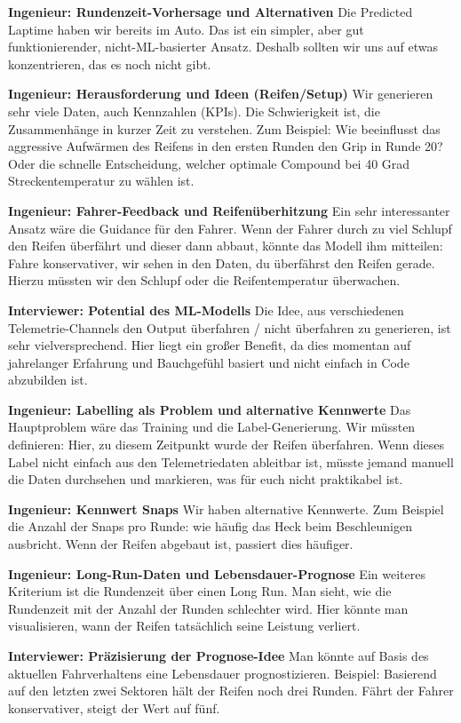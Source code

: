 \textbf{Ingenieur: Rundenzeit-Vorhersage und Alternativen}
Die Predicted Laptime haben wir bereits im Auto. Das ist ein simpler, aber gut funktionierender, nicht-ML-basierter Ansatz. Deshalb sollten wir uns auf etwas konzentrieren, das es noch nicht gibt.

\textbf{Ingenieur: Herausforderung und Ideen (Reifen/Setup)}
Wir generieren sehr viele Daten, auch Kennzahlen (KPIs). Die Schwierigkeit ist, die Zusammenhänge in kurzer Zeit zu verstehen. Zum Beispiel: Wie beeinflusst das aggressive Aufwärmen des Reifens in den ersten Runden den Grip in Runde 20? Oder die schnelle Entscheidung, welcher optimale Compound bei 40 Grad Streckentemperatur zu wählen ist.

\textbf{Ingenieur: Fahrer-Feedback und Reifenüberhitzung}
Ein sehr interessanter Ansatz wäre die Guidance für den Fahrer. Wenn der Fahrer durch zu viel Schlupf den Reifen überfährt und dieser dann abbaut, könnte das Modell ihm mitteilen: Fahre konservativer, wir sehen in den Daten, du überfährst den Reifen gerade. Hierzu müssten wir den Schlupf oder die Reifentemperatur überwachen.

\textbf{Interviewer: Potential des ML-Modells}
Die Idee, aus verschiedenen Telemetrie-Channels den Output überfahren / nicht überfahren zu generieren, ist sehr vielversprechend. Hier liegt ein großer Benefit, da dies momentan auf jahrelanger Erfahrung und Bauchgefühl basiert und nicht einfach in Code abzubilden ist.

\textbf{Ingenieur: Labelling als Problem und alternative Kennwerte}
Das Hauptproblem wäre das Training und die Label-Generierung. Wir müssten definieren: Hier, zu diesem Zeitpunkt wurde der Reifen überfahren. Wenn dieses Label nicht einfach aus den Telemetriedaten ableitbar ist, müsste jemand manuell die Daten durchsehen und markieren, was für euch nicht praktikabel ist.

\textbf{Ingenieur: Kennwert Snaps}
Wir haben alternative Kennwerte. Zum Beispiel die Anzahl der Snaps pro Runde: wie häufig das Heck beim Beschleunigen ausbricht. Wenn der Reifen abgebaut ist, passiert dies häufiger.

\textbf{Ingenieur: Long-Run-Daten und Lebensdauer-Prognose}
Ein weiteres Kriterium ist die Rundenzeit über einen Long Run. Man sieht, wie die Rundenzeit mit der Anzahl der Runden schlechter wird. Hier könnte man visualisieren, wann der Reifen tatsächlich seine Leistung verliert.

\textbf{Interviewer: Präzisierung der Prognose-Idee}
Man könnte auf Basis des aktuellen Fahrverhaltens eine Lebensdauer prognostizieren. Beispiel: Basierend auf den letzten zwei Sektoren hält der Reifen noch drei Runden. Fährt der Fahrer konservativer, steigt der Wert auf fünf.

